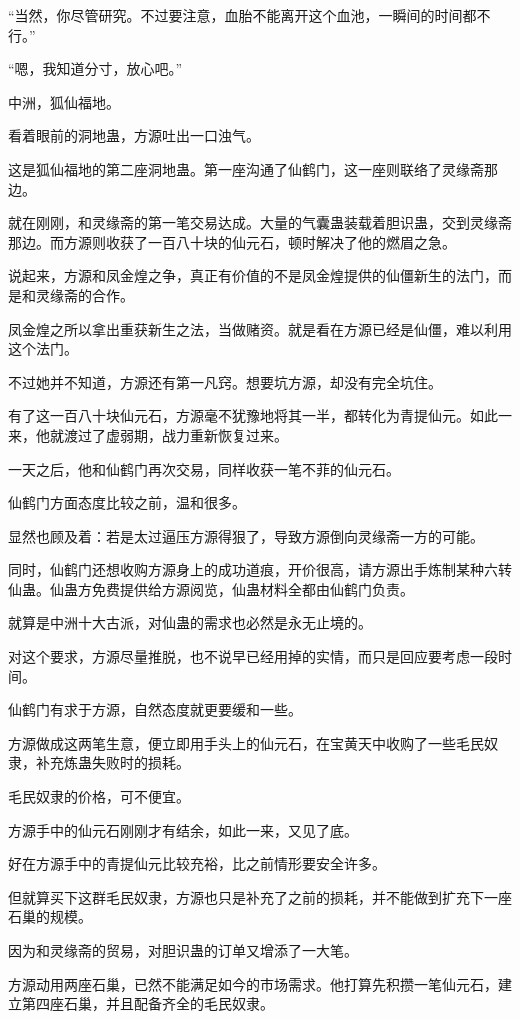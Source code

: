 \begin{this_body}
“当然，你尽管研究。不过要注意，血胎不能离开这个血池，一瞬间的时间都不行。”

“嗯，我知道分寸，放心吧。”

中洲，狐仙福地。

看着眼前的洞地蛊，方源吐出一口浊气。

这是狐仙福地的第二座洞地蛊。第一座沟通了仙鹤门，这一座则联络了灵缘斋那边。

就在刚刚，和灵缘斋的第一笔交易达成。大量的气囊蛊装载着胆识蛊，交到灵缘斋那边。而方源则收获了一百八十块的仙元石，顿时解决了他的燃眉之急。

说起来，方源和凤金煌之争，真正有价值的不是凤金煌提供的仙僵新生的法门，而是和灵缘斋的合作。

凤金煌之所以拿出重获新生之法，当做赌资。就是看在方源已经是仙僵，难以利用这个法门。

不过她并不知道，方源还有第一凡窍。想要坑方源，却没有完全坑住。

有了这一百八十块仙元石，方源毫不犹豫地将其一半，都转化为青提仙元。如此一来，他就渡过了虚弱期，战力重新恢复过来。

一天之后，他和仙鹤门再次交易，同样收获一笔不菲的仙元石。

仙鹤门方面态度比较之前，温和很多。

显然也顾及着：若是太过逼压方源得狠了，导致方源倒向灵缘斋一方的可能。

同时，仙鹤门还想收购方源身上的成功道痕，开价很高，请方源出手炼制某种六转仙蛊。仙蛊方免费提供给方源阅览，仙蛊材料全都由仙鹤门负责。

就算是中洲十大古派，对仙蛊的需求也必然是永无止境的。

对这个要求，方源尽量推脱，也不说早已经用掉的实情，而只是回应要考虑一段时间。

仙鹤门有求于方源，自然态度就更要缓和一些。

方源做成这两笔生意，便立即用手头上的仙元石，在宝黄天中收购了一些毛民奴隶，补充炼蛊失败时的损耗。

毛民奴隶的价格，可不便宜。

方源手中的仙元石刚刚才有结余，如此一来，又见了底。

好在方源手中的青提仙元比较充裕，比之前情形要安全许多。

但就算买下这群毛民奴隶，方源也只是补充了之前的损耗，并不能做到扩充下一座石巢的规模。

因为和灵缘斋的贸易，对胆识蛊的订单又增添了一大笔。

方源动用两座石巢，已然不能满足如今的市场需求。他打算先积攒一笔仙元石，建立第四座石巢，并且配备齐全的毛民奴隶。


\end{this_body}
